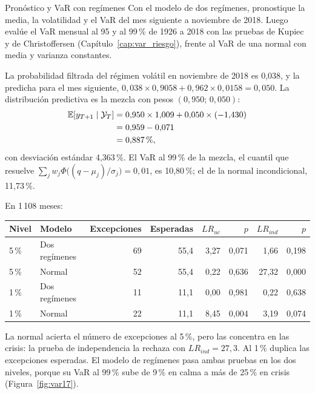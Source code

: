 \begin{ejresuelto}{Pronóstico y VaR con regímenes}\label{ej:var17}
\enunciado Con el modelo de dos regímenes, pronostique la media, la volatilidad y el VaR del mes siguiente a noviembre de 2018.
Luego evalúe el VaR mensual al 95 y al 99\,\% de 1926 a 2018 con las pruebas de Kupiec y de Christoffersen
(Capítulo~\ref{cap:var_riesgo}), frente al VaR de una normal con media y varianza constantes.

\solucion
{} La probabilidad filtrada del régimen volátil en noviembre de 2018 es 0,038, y la predicha para el mes
siguiente, $0{,}038\times0{,}9058+0{,}962\times0{,}0158=0{,}050$. La distribución predictiva es la mezcla con pesos
$(0{,}950;\,0{,}050)$:
\begin{align*}
  \mathbb{E}[y_{T+1}\mid\mathcal Y_T] &= 0{,}950\times1{,}009+0{,}050\times(-1{,}430)\\
                              &= 0{,}959-0{,}071\\
                              &= 0{,}887\,\text{\%},
\end{align*}
con desviación estándar 4,363\,\%. El VaR al 99\,\% de la mezcla, el cuantil que resuelve
$\sum_j w_j\Phi\bigl((q-\mu_j)/\sigma_j\bigr)=0{,}01$, es 10,80\,\%; el de la normal incondicional, 11,73\,\%.

 En 1\,108 meses:
\begin{center}\small
\begin{tabular}{@{}llrrrrrr@{}}
\toprule
Nivel & Modelo & Excepciones & Esperadas & $LR_{uc}$ & $p$ & $LR_{ind}$ & $p$ \\
\midrule
5\,\% & Dos regímenes & 69 & 55,4 & 3,27 & 0,071 & 1,66 & 0,198 \\
5\,\% & Normal & 52 & 55,4 & 0,22 & 0,636 & 27,32 & 0,000 \\
1\,\% & Dos regímenes & 11 & 11,1 & 0,00 & 0,981 & 0,22 & 0,638 \\
1\,\% & Normal & 22 & 11,1 & 8,45 & 0,004 & 3,19 & 0,074 \\
\bottomrule
\end{tabular}
\end{center}
La normal acierta el número de excepciones al 5\,\%, pero las concentra en las crisis: la prueba de independencia la rechaza
con $LR_{ind}=27{,}3$. Al 1\,\% duplica las excepciones esperadas. El modelo de regímenes pasa ambas pruebas en los dos niveles,
porque su VaR al 99\,\% sube de 9\,\% en calma a más de 25\,\% en crisis (Figura~\ref{fig:var17}).


\end{ejresuelto}
